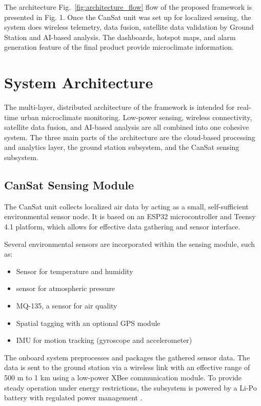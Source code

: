 \documentclass[conference]{IEEEtran}
\begin{document}
The architecture Fig.~\ref{fig:architecture_flow}  flow of the proposed framework is presented in Fig. 1. Once the CanSat unit was set up for localized sensing, the system does wireless telemetry, data fusion, satellite data validation by Ground Station and AI-based analysis. The dashboards, hotspot maps, and alarm generation feature of the final product provide microclimate information.

\section{System Architecture}

The multi-layer, distributed architecture of the framework is intended for real-time urban microclimate monitoring. Low-power sensing, wireless connectivity, satellite data fusion, and AI-based analysis are all combined into one cohesive system. The three main parts of the architecture are the cloud-based processing and analytics layer, the ground station subsystem, and the CanSat sensing subsystem.

\subsection{CanSat Sensing Module}

The CanSat unit collects localized air data by acting as a small, self-sufficient environmental sensor node. It is based on an ESP32 microcontroller and Teensy 4.1 platform, which allows for effective data gathering and sensor interface.

Several environmental sensors are incorporated within the sensing module, such as:
\begin{itemize}
    \item Sensor for temperature and humidity
    \item sensor for atmospheric pressure
    \item MQ-135, a sensor for air quality
    \item Spatial tagging with an optional GPS module
    \item IMU for motion tracking (gyroscope and accelerometer)
\end{itemize}

The onboard system preprocesses and packages the gathered sensor data. The data is sent to the ground station via a wireless link with an effective range of 500 m to 1 km using a low-power XBee communication module. To provide steady operation under energy restrictions, the subsystem is powered by a Li-Po battery with regulated power management \cite{p4}.
\end{document}
